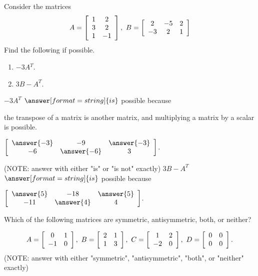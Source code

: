\documentclass{ximera}
\author{Zack Reed}
\begin{document}
\begin{exercise}
  Consider the matrices
  \begin{equation*}
    A = \startmat{cc}
      1 & 2 \\
      3 & 2 \\
      1 & -1
    \stopmat,
    \quad
    B = \startmat{ccc}
      2 & -5 & 2 \\
      -3 & 2 & 1
    \stopmat
  \end{equation*}
  Find the following if possible.
  \begin{enumerate}
  \item $-3A{^T}$.
  \item $3B - A^T$.
  \end{enumerate}

  $-3A^T$ $\answer[format=string]{is}$ possible because

  \begin{problem}
    the transpose of a matrix is another matrix, and multiplying a matrix by a scalar is possible.


$\startmat{ccc}
        \answer{-3} & -9 & \answer{-3} \\
        -6 & \answer{-6} & 3
      \stopmat$.
\end{problem}

(NOTE: answer with either "is" or "is not" exactly)
$3B - A^T$ $\answer[format=string]{is}$ possible because

  \begin{problem}
\begin{selectAll}
\end{selectAll}

$\startmat{ccc}
        \answer{5} & -18 & \answer{5} \\
        -11 & \answer{4} & 4
      \stopmat$.
      \end{problem}



  Which of the following matrices are symmetric, antisymmetric, both,
  or neither?

  \begin{equation*}
    A = \startmat{cc}
      0 & 1 \\
      -1 & 0
    \stopmat,
    \quad
    B = \startmat{cc}
      2 & 1 \\
      1 & 3
    \stopmat,
    \quad
    C = \startmat{cc}
      1 & 2 \\
      -2 & 0
    \stopmat,
    \quad
    D = \startmat{cc}
      0 & 0 \\
      0 & 0
    \stopmat.
  \end{equation*}
  (NOTE: answer with either "symmetric", "antisymmetric", "both", or "neither" exactly)


\end{exercise}
\end{document}
